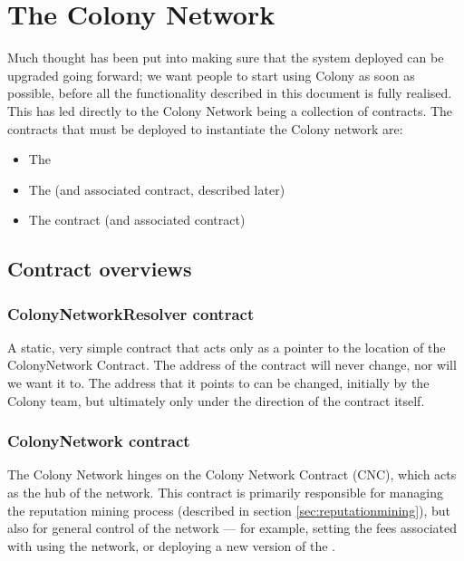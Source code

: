 \section{The Colony Network}

Much thought has been put into making sure that the system deployed can be upgraded going forward; we want people to start using Colony as soon as possible, before all the functionality described in this document is fully realised. This has led directly to the Colony Network being a collection of contracts. The contracts that must be deployed to instantiate the Colony network are:

\begin{itemize}
\item The 
\item The  (and associated  contract, described later)
\item The  contract (and associated  contract)
\end{itemize}
\subsection{Contract overviews}

\subsubsection{ColonyNetworkResolver contract}
A static, very simple contract that acts only as a pointer to the location of the ColonyNetwork Contract. The address of the  contract will never change, nor will we want it to. The address that it points to can be changed, initially by the Colony team, but ultimately only under the direction of the  contract itself.

\subsubsection {ColonyNetwork contract}

The Colony Network hinges on the Colony Network Contract (CNC), which acts as the hub of the network. This contract is primarily responsible for managing the reputation mining process (described in section \ref{sec:reputationmining}), but also for general control of the network --- for example, setting the fees associated with using the network, or deploying a new version of the .

